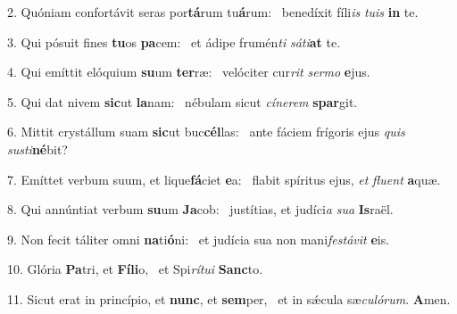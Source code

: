 2. Quóniam confortávit seras por\textbf{tá}rum tu\textbf{á}rum: \ast\  benedíxit fíli\textit{is} \textit{tu}\textit{is} \textbf{in} te.\

3. Qui pósuit fines \textbf{tu}os \textbf{pa}cem: \ast\  et ádipe frumén\textit{ti} \textit{sá}\textit{ti}\textbf{at} te.\

4. Qui emíttit elóquium \textbf{su}um \textbf{ter}ræ: \ast\  velóciter cur\textit{rit} \textit{ser}\textit{mo} \textbf{e}jus.\

5. Qui dat nivem \textbf{sic}ut \textbf{la}nam: \ast\  nébulam sicut \textit{cí}\textit{ne}\textit{rem} \textbf{spar}git.\

6. Mittit crystállum suam \textbf{sic}ut buc\textbf{cél}las: \ast\  ante fáciem frígoris ejus \textit{quis} \textit{sus}\textit{ti}\textbf{né}bit?\

7. Emíttet verbum suum, et lique\textbf{fá}ciet \textbf{e}a: \ast\  flabit spíritus ejus, \textit{et} \textit{flu}\textit{ent} \textbf{a}quæ.\

8. Qui annúntiat verbum \textbf{su}um \textbf{Ja}cob: \ast\  justítias, et judíci\textit{a} \textit{su}\textit{a} \textbf{Is}raël.\

9. Non fecit táliter omni \textbf{na}ti\textbf{ó}ni: \ast\  et judícia sua non mani\textit{fes}\textit{tá}\textit{vit} \textbf{e}is.\

10. Glória \textbf{Pa}tri, et \textbf{Fí}\textbf{li}o, \ast\  et Spi\textit{rí}\textit{tu}\textit{i} \textbf{Sanc}to.\

11. Sicut erat in princípio, et \textbf{nunc}, et \textbf{sem}per, \ast\  et in sǽcula sæ\textit{cu}\textit{ló}\textit{rum}. \textbf{A}men.\

